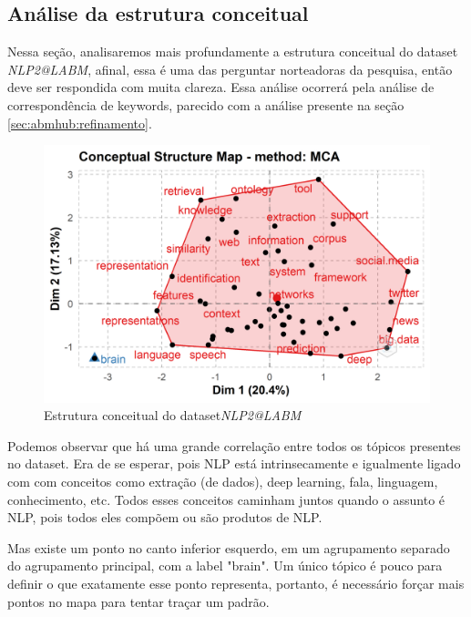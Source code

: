\subsection{Análise da estrutura conceitual}

Nessa seção, analisaremos mais profundamente a estrutura conceitual do dataset \textit{NLP2@LABM}, afinal, essa é uma das perguntar norteadoras da pesquisa, então deve ser respondida com muita clareza. Essa análise ocorrerá pela análise de correspondência de keywords, parecido com a análise presente na seção \ref{sec:abmhub:refinamento}.

 \begin{figure}
    \centering
    \includegraphics[width=1\textwidth]{experiments/ABMHub/PesquisaBibliometrica/NLP/estruturaConceitual.png}
    \caption{Estrutura conceitual do dataset\textit{NLP2@LABM}}
    \label{fig:ABMHub:EC}
\end{figure}

Podemos observar que há uma grande correlação entre todos os tópicos presentes no dataset. Era de se esperar, pois NLP está intrinsecamente e igualmente ligado com com conceitos como extração (de dados), deep learning, fala, linguagem, conhecimento, etc. Todos esses conceitos caminham juntos quando o assunto é NLP, pois todos eles compõem ou são produtos de NLP.

Mas existe um ponto no canto inferior esquerdo, em um agrupamento separado do agrupamento principal, com a label "brain". Um único tópico é pouco para definir o que exatamente esse ponto representa, portanto, é necessário forçar mais pontos no mapa para tentar traçar um padrão.

